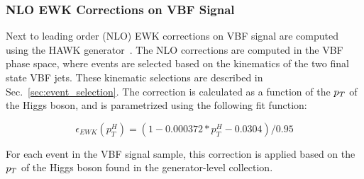 \clearpage

\subsubsection{NLO EWK Corrections on VBF Signal}
\label{subsubsec:vbf_nlo_ewk}

Next to leading order (NLO) EWK corrections on VBF signal are computed using the HAWK generator~\cite{HAWKGenerator}. 
The NLO corrections are computed in the VBF phase space, where events are selected based on the kinematics of the two final state VBF jets.
These kinematic selections are described in Sec.~\ref{sec:event_selection}.
The correction is calculated as a function of the $p_T$ of the Higgs boson, and is parametrized using the following fit function:

\begin{equation}
    \epsilon_{EWK}(p_T^{H}) = (1 - 0.000372 * p_T^{H} - 0.0304) / 0.95
\end{equation}

For each event in the VBF signal sample, this correction is applied based on the $p_T$ of the Higgs boson found in the generator-level collection.
